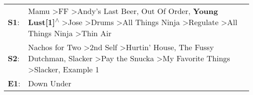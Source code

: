 \begin{supertabular}{p{0.03\textwidth}p{0.92\textwidth}}
 \textbf{S1}:  &  Mamu\textsuperscript{} \textgreater \enspace FF\textsuperscript{} \textgreater \enspace Andy's Last Beer\textsuperscript{}, \enspace Out Of Order\textsuperscript{}, \enspace \textbf{Young Lust[1]\textsuperscript{$\wedge$}} \textgreater \enspace Jose\textsuperscript{} \textgreater \enspace Drums\textsuperscript{} \textgreater \enspace All Things Ninja\textsuperscript{} \textgreater \enspace Regulate\textsuperscript{} \textgreater \enspace All Things Ninja\textsuperscript{} \textgreater \enspace Thin Air\textsuperscript{}  \enspace  \\
 \textbf{S2}:  &                                                                                                             Nachos for Two\textsuperscript{} \textgreater \enspace 2nd Self\textsuperscript{} \textgreater \enspace Hurtin' House\textsuperscript{}, \enspace The Fussy Dutchman\textsuperscript{}, \enspace Slacker\textsuperscript{} \textgreater \enspace Pay the Snucka\textsuperscript{} \textgreater \enspace My Favorite Things\textsuperscript{} \textgreater \enspace Slacker\textsuperscript{}, \enspace Example 1\textsuperscript{}  \enspace  \\
 \textbf{E1}:  &                                                                                                                                                                                                                                                                                                                                                                                                                                                                                                                   Down Under\textsuperscript{}  \enspace  \\
\end{supertabular}
